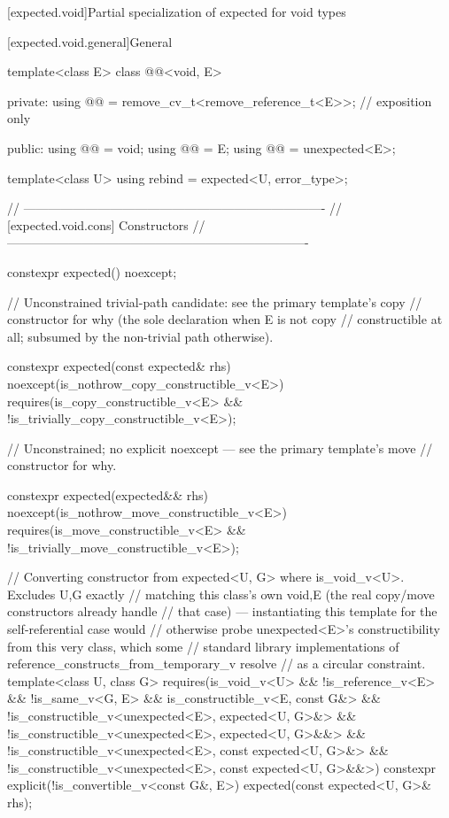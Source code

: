 [expected.void]{Partial specialization of expected for void types}

[expected.void.general]{General}

\begin{codeblock}
template<class E>
class @@<void, E> {
private:
  using @@ = remove_cv_t<remove_reference_t<E>>; // exposition only

public:
  using @@ = void;
  using @@ = E;
  using @@ = unexpected<E>;

  template<class U> using rebind = expected<U, error_type>;

  // -------------------------------------------------------------------------
  // [expected.void.cons] Constructors
  // -------------------------------------------------------------------------

  constexpr expected() noexcept;

  // Unconstrained trivial-path candidate: see the primary template's copy
  // constructor for why (the sole declaration when E is not copy
  // constructible at all; subsumed by the non-trivial path otherwise).

  constexpr expected(const expected& rhs) noexcept(is_nothrow_copy_constructible_v<E>)
    requires(is_copy_constructible_v<E> && !is_trivially_copy_constructible_v<E>);

  // Unconstrained; no explicit noexcept — see the primary template's move
  // constructor for why.

  constexpr expected(expected&& rhs) noexcept(is_nothrow_move_constructible_v<E>)
    requires(is_move_constructible_v<E> && !is_trivially_move_constructible_v<E>);

  // Converting constructor from expected<U, G> where is_void_v<U>. Excludes U,G exactly
  // matching this class's own void,E (the real copy/move constructors already handle
  // that case) — instantiating this template for the self-referential case would
  // otherwise probe unexpected<E>'s constructibility from this very class, which some
  // standard library implementations of reference_constructs_from_temporary_v resolve
  // as a circular constraint.
  template<class U, class G>
    requires(is_void_v<U> && !is_reference_v<E> && !is_same_v<G, E> &&
             is_constructible_v<E, const G&> &&
             !is_constructible_v<unexpected<E>, expected<U, G>&> &&
             !is_constructible_v<unexpected<E>, expected<U, G>&&> &&
             !is_constructible_v<unexpected<E>, const expected<U, G>&> &&
             !is_constructible_v<unexpected<E>, const expected<U, G>&&>)
  constexpr explicit(!is_convertible_v<const G&, E>)
      expected(const expected<U, G>& rhs);

}
\end{codeblock}
